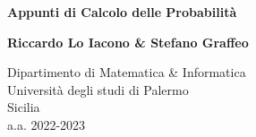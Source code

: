 \documentclass{subfiles}
\begin{document}
\begin{titlepage}
    \begin{center}
        \vspace*{1cm}

        \textbf{Appunti di Calcolo delle Probabilità}

        \vspace{1.5cm}

        \textbf{Riccardo Lo Iacono \& Stefano Graffeo}

        \vfill

        \vspace{0.8cm}

        Dipartimento di Matematica \& Informatica\\
        Università degli studi di Palermo\\
        Sicilia\\
        a.a. 2022-2023

    \end{center}
\end{titlepage}
\end{document}
